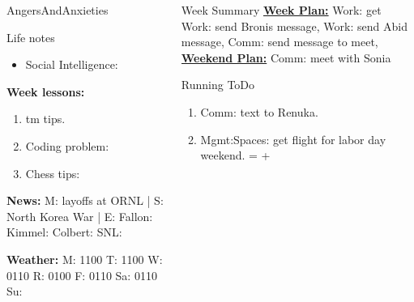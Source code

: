 \begin{columns}
\begin{column}{0.20\linewidth}
\begin{block}{AngersAndAnxieties}
\begin{itemize}
      \end{itemize}
    \end{block}
      \begin{block}{Life notes}
        \begin{itemize}
          \tiny \item \tiny Social Intelligence: 
        \end{itemize}
      \end{block}
      \begin{block}
        {\tiny {\bf Week lessons:}}
        \begin{enumerate}
        \item \tiny tm tips.
        \item \tiny Coding problem: 
        \item \tiny Chess tips: 
        \end{enumerate}
            {{\tiny {\tiny \bf  News:}} {\tiny  M: layoffs at ORNL | S: North Korea War
                | E: Fallon:  Kimmel:  Colbert: SNL:}}

            {{\tiny {\tiny \bf  Weather:}} {\tiny M: 1100 T: 1100 W:
                0110 R: 0100 F: 0110 Sa: 0110 Su: }}

             
      \end{block}
  \end{column}
  \begin{column}{0.6\linewidth}
    \begin{block}{Week Summary}
      {\underline {\bf Week Plan:} Work: get 
        Work: send Bronis message, Work: send Abid message, Comm: send
      message to meet, } \\
      {\underline{\bf Weekend Plan:} Comm: meet with Sonia} \\
    \end{block}
      \begin{block}{Running ToDo} %
        \begin{enumerate}
        \item \tiny Comm: text to Renuka. 
            
        \item \tiny Mgmt:Spaces: get flight for labor day weekend.    = 
           +
          

\end{enumerate}
\end{block}
\end{column}
\end{columns}
